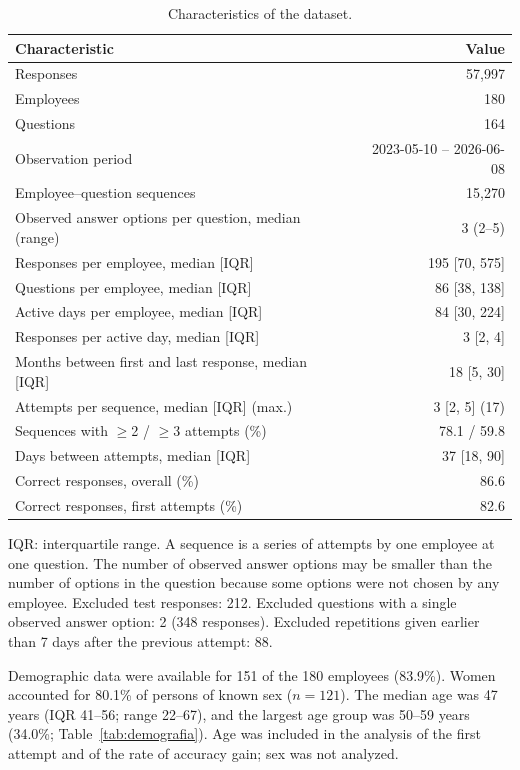 \documentclass[preprint,12pt,authoryear]{elsarticle}
\newcommand{\uwagatabeli}[1]{\par\vspace{2pt}\parbox{\linewidth}{\footnotesize #1}}
\begin{document}
\begin{table}[H]
\centering
\caption{Characteristics of the dataset.}
\label{tab:zbior_danych}
\small
\begin{tabular}{lr}
\toprule
Characteristic & Value \\
\midrule
Responses & 57{,}997 \\
Employees & 180 \\
Questions & 164 \\
Observation period & 2023-05-10 -- 2026-06-08 \\
Employee--question sequences & 15{,}270 \\
Observed answer options per question, median (range) & 3 (2--5) \\
\midrule
Responses per employee, median [IQR] & 195 [70, 575] \\
Questions per employee, median [IQR] & 86 [38, 138] \\
Active days per employee, median [IQR] & 84 [30, 224] \\
Responses per active day, median [IQR] & 3 [2, 4] \\
Months between first and last response, median [IQR] & 18 [5, 30] \\
\midrule
Attempts per sequence, median [IQR] (max.) & 3 [2, 5] (17) \\
Sequences with $\geq$2 / $\geq$3 attempts (\%) & 78.1 / 59.8 \\
Days between attempts, median [IQR] & 37 [18, 90] \\
\midrule
Correct responses, overall (\%) & 86.6 \\
Correct responses, first attempts (\%) & 82.6 \\
\bottomrule
\end{tabular}
\uwagatabeli{IQR: interquartile range. A sequence is a series of attempts by one employee at one
question. The number of observed answer options may be smaller than the number of options in the
question because some options were not chosen by any employee. Excluded test responses: 212.
Excluded questions with a single observed answer option: 2 (348
responses). Excluded repetitions given earlier than 7 days after the previous attempt:
88.}
\end{table}

Demographic data were available for 151 of the 180 employees (83.9\%).
Women accounted for 80.1\% of persons of known sex ($n = 121$). The median age was
47 years (IQR 41--56; range 22--67), and the largest age group was
50--59 years (34.0\%; Table~\ref{tab:demografia}). Age was included in the
analysis of the first attempt and of the rate of accuracy gain; sex was not analyzed.
\end{document}
